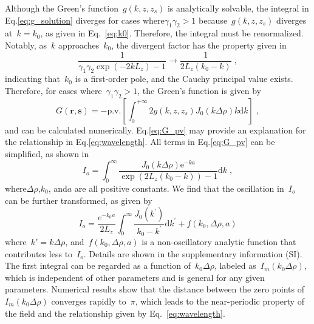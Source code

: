 \documentclass[aps,prl,reprint,showpacs,floatfix,superscriptaddress]{revtex4-2}
\newcommand{\V}[1]{\boldsymbol{#1}} %
\newcommand{\D}[1]{\Delta#1} %
\begin{document}
Although the Green's function~$g(k, z, z_s)$ is analytically solvable, the integral in Eq.\eqref{eq:g_solution} diverges for cases where$\gamma_1 \gamma_2 > 1$ because~$g(k, z, z_s)$ diverges at~$k=k_0$, as given in Eq.~\eqref{eq:k0}. 
Therefore, the integral must be renormalized.
Notably, as~$k$ approaches~$k_0$, the divergent factor has the property given in 
\begin{equation}
    \frac{1}{\gamma_1 \gamma_2 \exp{(-2 k L_z)} - 1} \to \frac{1}{2 L_z (k_0 - k)}\;,
\end{equation}
indicating that~$k_0$ is a first-order pole, and the Cauchy principal value exists.
Therefore, for cases where~$\gamma_1 \gamma_2 > 1$, the Green's function is given by 
\begin{equation}\label{eq:G_pv}
    G(\V{r}, \V{s}) = - \text{p.v.} \left[ \int_{0}^{+\infty} 2 g(k, z, z_s) J_0(k \Delta \rho) k \text{d}k \right]  \;,
\end{equation}
and can be calculated numerically.
Eq.\eqref{eq:G_pv} may provide an explanation for the relationship in Eq.\eqref{eq:wavelength}.
All terms in Eq.\eqref{eq:G_pv} can be simplified, as shown in 
\begin{equation}
    I_o = \int_0^{\infty} \frac{J_0(k \D \rho) \text{e}^{-ka}}{\exp{\left( 2 L_z (k_0 - k) \right)} - 1} \text{d}k\;,
\end{equation}
where$\Delta \rho$,$k_0$, and$a$ are all positive constants. 
We find that the oscillation in~$I_o$ can be further transformed, as given by  
\begin{equation}
    I_{o} = \frac{e^{-k_0 a}}{2L_z} \int_0^{\infty} \frac{J_0(k^\prime)}{k_0 - k^\prime} \text{d}k^\prime + f(k_0, \D \rho, a)
\end{equation}
where~$k' = k \Delta \rho$, and~$f(k_0, \Delta \rho, a)$ is a non-oscillatory analytic function that contributes less to~$I_o$. 
Details are shown in the supplementary information (SI).
The first integral can be regarded as a function of~$k_0 \Delta \rho$, labeled as~$I_m(k_0 \Delta \rho)$, which is independent of other parameters and is general for any given parameters. 
Numerical results show that the distance between the zero points of~$I_m(k_0 \Delta \rho)$ converges rapidly to~$\pi$, which leads to the near-periodic property of the field and the relationship given by Eq.~\eqref{eq:wavelength}.
\end{document}
